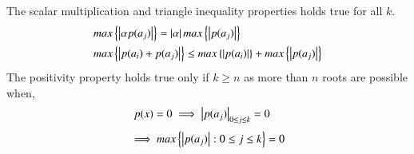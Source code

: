 The scalar multiplication and triangle inequality properties holds true for all $k$.
\begin{align}
    &max\left\{\left\vert\alpha p(a_j)\right\vert\right\} = \left\vert\alpha\right\vert max\left\{\left\vert p(a_j)\right\vert\right\}\\
    &max\left\{\left\vert p(a_i)+p(a_j)\right\vert\right\} \le max\left\{\left\vert p(a_i)\right\vert\right\} + max\left\{\left\vert p(a_j)\right\vert\right\}
\end{align}
The positivity property holds true only if $k \ge n$ as more than $n$ roots are possible when, 
\begin{align}
    p(x) &= 0 \implies \left\vert p(a_j)\right\vert_{0 \leq j \leq k}=0 
\end{align}
\begin{align}
    \implies max\left\{\left\vert p(a_j)\right\vert: 0 \leq j \leq k\right\}=0
\end{align}



